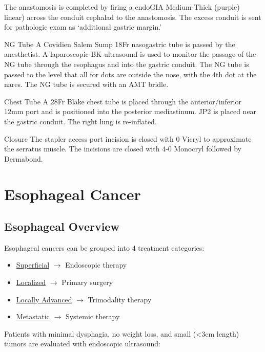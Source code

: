 \documentclass[
]{book}
\providecommand{\tightlist}{%
  \setlength{\itemsep}{0pt}\setlength{\parskip}{0pt}}
\begin{document}
The anastomosis is completed by firing a endoGIA Medium-Thick (purple) linear) across the conduit cephalad to the anastomosis. The excess conduit is sent for pathologic exam as `additional gastric margin.'

NG Tube
A Covidien Salem Sump 18Fr nasogastric tube is passed by the anesthetist. A laparoscopic BK ultrasound is used to monitor the passage of the NG tube through the esophagus and into the gastric conduit. The NG tube is passed to the level that all for dots are outside the nose, with the 4th dot at the nares. The NG tube is secured with an AMT bridle.

Chest Tube
A 28Fr Blake chest tube is placed through the anterior/inferior 12mm port and is positioned into the posterior mediastinum. JP2 is placed near the gastric conduit. The right lung is re-inflated.

Closure
The stapler access port incision is closed with 0 Vicryl to approximate the serratus muscle. The incisions are closed with 4-0 Monocryl followed by Dermabond.

\hypertarget{part-esophageal-cancer}{%
\part*{Esophageal Cancer}\label{part-esophageal-cancer}}

\hypertarget{EsoIntro}{%
\chapter{Esophageal Overview}\label{EsoIntro}}

Esophageal cancers can be grouped into 4 treatment categories:

\begin{itemize}
\tightlist
\item
  \protect\hyperlink{superficial}{Superficial} \(\rightarrow\) Endoscopic therapy
\item
  \protect\hyperlink{localized}{Localized} \(\rightarrow\) Primary surgery
\item
  \protect\hyperlink{locally_advanced}{Locally Advanced} \(\rightarrow\) Trimodality therapy
\item
  \protect\hyperlink{metastatic}{Metastatic} \(\rightarrow\) Systemic therapy
\end{itemize}

Patients with minimal dysphagia, no weight loss, and small (\textless3cm length) tumors are evaluated with endoscopic ultrasound:
\end{document}
